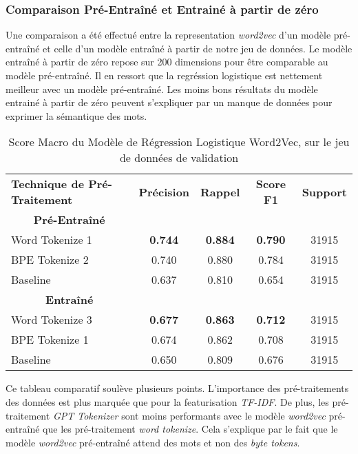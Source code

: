 \subsubsection{Comparaison Pré-Entraîné et Entrainé à partir de zéro}
Une comparaison a été effectué entre la representation \textit{word2vec} d'un modèle pré-entraîné et celle d'un modèle entraîné à partir de notre jeu de données. 
Le modèle entraîné à partir de zéro repose sur 200 dimensions pour être comparable au modèle pré-entraîné. 
Il en ressort que la regréssion logistique est nettement meilleur avec un modèle pré-entraîné. Les moins bons résultats du modèle entrainé à partir de zéro peuvent s'expliquer par un manque de données pour exprimer la sémantique des mots.
\begin{table}[ht]
    \centering
    \caption{Score Macro du Modèle de Régression Logistique Word2Vec, sur le jeu de données de validation}
    \begin{tabular}{lcccc}
    \hline
    \textbf{Technique de Pré-Traitement} & \textbf{Précision} & \textbf{Rappel} & \textbf{Score F1} & \textbf{Support}  \\
    \multicolumn{1}{c}{\textbf{Pré-Entraîné}} \\
    Word Tokenize 1             & \textbf{0.744}              & \textbf{0.884}           & \textbf{0.790}            & 31915            \\
    BPE Tokenize 2              & 0.740              & 0.880           & 0.784            & 31915            \\ \hline 
    Baseline                     & 0.637              & 0.810           & 0.654            & 31915            \\
    \hline \multicolumn{1}{c}{\textbf{Entraîné}} \\
    Word Tokenize 3             & \textbf{0.677}              & \textbf{0.863}           & \textbf{0.712}            & 31915            \\
    BPE Tokenize 1              & 0.674              & 0.862           & 0.708            & 31915            \\ \hline
    Baseline               & 0.650              & 0.809           & 0.676            & 31915            \\ 
    \hline \end{tabular}
    \label{tab:results}
\end{table}

Ce tableau comparatif soulève plusieurs points.
L'importance des pré-traitements des données est plus marquée que pour la featurisation \textit{TF-IDF}. 
De plus, les pré-traitement \textit{GPT Tokenizer} sont moins performants avec le modèle \textit{word2vec} pré-entraîné que les pré-traitement \textit{word tokenize}. 
Cela s'explique par le fait que le modèle \textit{word2vec} pré-entraîné attend des mots et non des \textit{byte tokens}.
